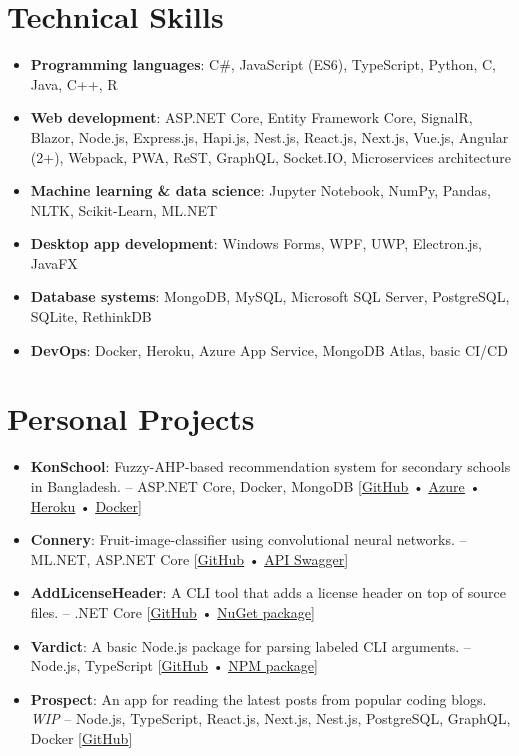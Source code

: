 \documentclass[letter-paper,10pt]{article}
\newcommand{\resumeItem}[2]{
  \item\small{
    \textbf{#1}{: #2 \vspace{-2pt}}
  }
}
\newcommand{\resumeSubItem}[2]{\resumeItem{#1}{#2}\vspace{-3pt}}
\newcommand{\resumeSubHeadingListStart}{\begin{itemize}[leftmargin=*]}
\newcommand{\resumeSubHeadingListEnd}{\end{itemize}}
\begin{document}
\section{Technical Skills}
  \resumeSubHeadingListStart
    \resumeSubItem{Programming languages}
      {C\#, JavaScript (ES6), TypeScript, Python, C, Java, C++, R}
    \resumeSubItem{Web development}
      {ASP.NET Core, Entity Framework Core, SignalR, Blazor, Node.js, Express.js, Hapi.js, Nest.js, React.js, Next.js, Vue.js, Angular (2+), Webpack, PWA, ReST, GraphQL, Socket.IO, Microservices architecture}
    \resumeSubItem{Machine learning \& data science}
      {Jupyter Notebook, NumPy, Pandas, NLTK, Scikit-Learn, ML.NET}
    \resumeSubItem{Desktop app development}
      {Windows Forms, WPF, UWP, Electron.js, JavaFX}
    \resumeSubItem{Database systems}
      {MongoDB, MySQL, Microsoft SQL Server, PostgreSQL, SQLite, RethinkDB}
    \resumeSubItem{DevOps}
      {Docker, Heroku, Azure App Service, MongoDB Atlas, basic CI/CD}
  \resumeSubHeadingListEnd

\vspace{-3pt}

\section{Personal Projects}
  \resumeSubHeadingListStart
    \resumeSubItem{KonSchool}
      {Fuzzy-AHP-based recommendation system for secondary schools in Bangladesh. -- ASP.NET Core, Docker, MongoDB [\href{https://github.com/maacpiash/KonSchool}{\underline{GitHub}} • \href{https://konschool.azurewebsites.net/}{\underline{Azure}} • \href{https://konschool.herokuapp.com}{\underline{Heroku}} • \href{https://hub.docker.com/r/maacpiash/konschool}{\underline{Docker}}]}
    \resumeSubItem{Connery}
      {Fruit-image-classifier using convolutional neural networks. -- ML.NET, ASP.NET Core [\href{https://github.com/maacpiash/Connery}{\underline{GitHub}} • \href{https://connery-api.herokuapp.com}{\underline{API Swagger}}]}
    \resumeSubItem{AddLicenseHeader}
      {A CLI tool that adds a license header on top of source files. -- .NET Core [\href{https://github.com/maacpiash/addlh}{\underline{GitHub}} • \href{https://www.nuget.org/packages/AddLicenseHeader}{\underline{NuGet package}}]}
    \resumeSubItem{Vardict}
      {A basic Node.js package for parsing labeled CLI arguments. -- Node.js, TypeScript [\href{https://github.com/maacpiash/vardict}{\underline{GitHub}} • \href{https://www.npmjs.com/package/vardict/}{\underline{NPM package}}]}
    \resumeSubItem{Prospect}
      {An app for reading the latest posts from popular coding blogs. \textit{WIP} -- Node.js, TypeScript, React.js, Next.js, Nest.js, PostgreSQL, GraphQL, Docker [\href{https://github.com/maacpiash/Prospect}{\underline{GitHub}}]}
  \resumeSubHeadingListEnd
  
\end{document}
